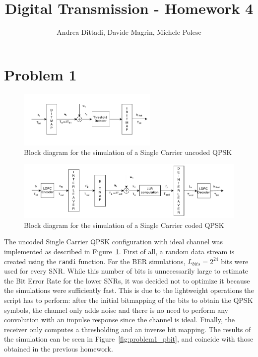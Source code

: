 \documentclass[10pt]{article}
\begin{document}
\title{Digital Transmission - Homework 4}
\author{Andrea Dittadi, Davide Magrin, Michele Polese}

\maketitle


\section*{Problem 1}


\begin{figure}
	\centering
	\includegraphics[width = 0.6\textwidth]{SC_uncoded}
	\caption{Block diagram for the simulation of a Single Carrier uncoded QPSK}
	\label{fig:problem1_scuncoded}
\end{figure}

\begin{figure}
	\centering
	\includegraphics[width = \textwidth]{SC_coded}
	\caption{Block diagram for the simulation of a Single Carrier coded QPSK}
	\label{fig:problem1_sccoded}
\end{figure}

The uncoded Single Carrier QPSK configuration with ideal channel was implemented as described in Figure~\ref{fig:problem1_scuncoded}. First of all, a random data stream is created using the \texttt{randi} function. For the BER simulations, $L_{bits} = 2^{24}$ bits were used for every SNR. While this number of bits is unnecessarily large to estimate the Bit Error Rate for the lower SNRs, it was decided not to optimize it because the simulations were sufficiently fast. This is due to the lightweight operations the script has to perform: after the initial bitmapping of the bits to obtain the QPSK symbols, the channel only adds noise and there is no need to perform any convolution with an impulse response since the channel is ideal. Finally, the receiver only computes a thresholding and an inverse bit mapping. The results of the simulation can be seen in Figure~\ref{fig:problem1_pbit}, and coincide with those obtained in the previous homework. %
\end{document}
